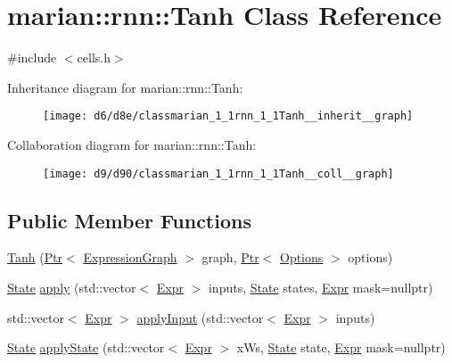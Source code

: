 \hypertarget{classmarian_1_1rnn_1_1Tanh}{}\section{marian\+:\+:rnn\+:\+:Tanh Class Reference}
\label{classmarian_1_1rnn_1_1Tanh}


{\ttfamily \#include $<$cells.\+h$>$}



Inheritance diagram for marian\+:\+:rnn\+:\+:Tanh\+:
\nopagebreak
\begin{figure}[H]
\begin{center}
\leavevmode
\texttt{[image: d6/d8e/classmarian\_1\_1rnn\_1\_1Tanh\_\_inherit\_\_graph]}
\end{center}
\end{figure}


Collaboration diagram for marian\+:\+:rnn\+:\+:Tanh\+:
\nopagebreak
\begin{figure}[H]
\begin{center}
\leavevmode
\texttt{[image: d9/d90/classmarian\_1\_1rnn\_1\_1Tanh\_\_coll\_\_graph]}
\end{center}
\end{figure}
\subsection*{Public Member Functions}
\begin{DoxyCompactItemize}
\item 
\hyperlink{classmarian_1_1rnn_1_1Tanh_ae1971d0005d9f0bdb08ed2c0ecec32dc}{Tanh} (\hyperlink{namespacemarian_ad1a373be43a00ef9ce35666145137b08}{Ptr}$<$ \hyperlink{classmarian_1_1ExpressionGraph}{Expression\+Graph} $>$ graph, \hyperlink{namespacemarian_ad1a373be43a00ef9ce35666145137b08}{Ptr}$<$ \hyperlink{classmarian_1_1Options}{Options} $>$ options)
\item 
\hyperlink{structmarian_1_1rnn_1_1State}{State} \hyperlink{classmarian_1_1rnn_1_1Tanh_acdaec0ddca02a9bcc45f2b436c64d310}{apply} (std\+::vector$<$ \hyperlink{namespacemarian_a498d8baf75b754011078b890b39c8e12}{Expr} $>$ inputs, \hyperlink{structmarian_1_1rnn_1_1State}{State} states, \hyperlink{namespacemarian_a498d8baf75b754011078b890b39c8e12}{Expr} mask=nullptr)
\item 
std\+::vector$<$ \hyperlink{namespacemarian_a498d8baf75b754011078b890b39c8e12}{Expr} $>$ \hyperlink{classmarian_1_1rnn_1_1Tanh_a27567fac50eea00c776cc76d6f9351df}{apply\+Input} (std\+::vector$<$ \hyperlink{namespacemarian_a498d8baf75b754011078b890b39c8e12}{Expr} $>$ inputs)
\item 
\hyperlink{structmarian_1_1rnn_1_1State}{State} \hyperlink{classmarian_1_1rnn_1_1Tanh_a241e6bcc6cb37c94c8965dea5a5e2e91}{apply\+State} (std\+::vector$<$ \hyperlink{namespacemarian_a498d8baf75b754011078b890b39c8e12}{Expr} $>$ x\+Ws, \hyperlink{structmarian_1_1rnn_1_1State}{State} state, \hyperlink{namespacemarian_a498d8baf75b754011078b890b39c8e12}{Expr} mask=nullptr)
\end{DoxyCompactItemize}
